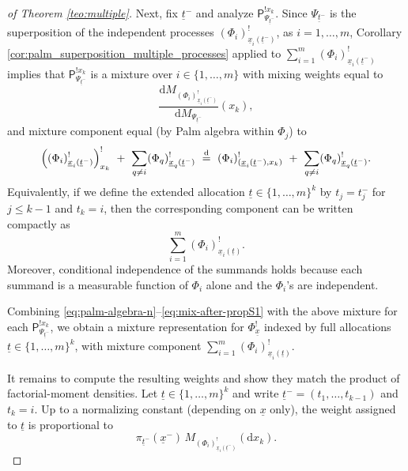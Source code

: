 \documentclass[11pt,a4paper,oneside]{article}
\newcommand{\deq}{\stackrel{\mbox{\scriptsize d}}{=}}
\newcommand{\dd}{\mathrm d}
\newcommand{\plaw}{\mathsf{P}}
\renewcommand{\mid}{\ensuremath{\,|\,}}
\theoremstyle{definition}
\theoremstyle{remark}
\begin{document}
\begin{proof}[of Theorem \ref{teo:multiple}]
Next, fix $\underline{t}^-$ and analyze $\plaw^{!x_k}_{\Psi_{\underline{t}^-}}$.
Since $\Psi_{\underline{t}^-}$ is the superposition of the independent processes $(\Phi_i)^!_{\underline{x}_i(\underline{t}^-)}$, as $i=1, \ldots, m$, Corollary \ref{cor:palm_superposition_multiple_processes} applied to
$\sum_{i=1}^m (\Phi_i)^!_{\underline{x}_i(\underline{t}^-)}$ implies that $\plaw^{!x_k}_{\Psi_{\underline{t}^-}}$ is a mixture over $i\in\{1,\ldots,m\}$ with
mixing weights equal to
\[
\frac{\dd M_{(\Phi_i)^!_{\underline{x}_i(\underline{t}^-)}}}{\dd M_{\Psi_{\underline{t}^-}}}(x_k), 
\]
and mixture component equal (by Palm algebra within
$\Phi_j$) to
\[
\left((\Phi_i)^!_{\underline{x}_i(\underline{t}^-)}\right)^!_{x_k}\ +\ \sum_{q\neq i} (\Phi_q)^!_{\underline{x}_q(\underline{t}^-)}
\ \deq\
(\Phi_i)^!_{(\underline{x}_i(\underline{t}^-),x_k)}\ +\ \sum_{q\neq i} (\Phi_q)^!_{\underline{x}_q(\underline{t}^-)}.
\]
Equivalently, if we define the extended allocation $\underline{t}\in\{1,\ldots,m\}^k$ by $t_j=t^-_j$ for $j\leq k-1$ and $t_k=i$, then the
corresponding component can be written compactly as 
\[
\sum_{i=1}^m (\Phi_i)^!_{\underline{x}_i(\underline{t})}.
\]
Moreover, conditional independence of the summands holds because each summand is a measurable function of $\Phi_i$ alone and the
$\Phi_i$'s are independent.

Combining \eqref{eq:palm-algebra-n}--\eqref{eq:mix-after-propS1} with the above mixture for each $\plaw^{!x_k}_{\Psi_{\underline{t}^-}}$, we obtain a
mixture representation for $\Phi^!_{\underline{x}}$ indexed by full allocations $\underline{t}\in\{1,\ldots,m\}^k$, with mixture component
$\sum_{i=1}^m (\Phi_i)^!_{\underline{x}_i(\underline{t})}$.

It remains to compute the resulting weights and show they match the product of factorial-moment densities.
Let $\underline{t}\in\{1,\ldots,m\}^k$ and write $\underline{t}^-=(t_1,\ldots,t_{k-1})$ and $t_k=i$.
Up to a normalizing constant (depending on $\underline{x}$ only), the weight assigned to $\underline{t}$ is proportional to 
\begin{equation}
\label{eq:weight-decomp}
\pi_{\underline{t}^-}(\underline{x}^-)\,M_{(\Phi_i)^!_{\underline{x}_i(\underline{t}^-)}}(\dd x_k).
\end{equation}


\end{proof}
\end{document}
